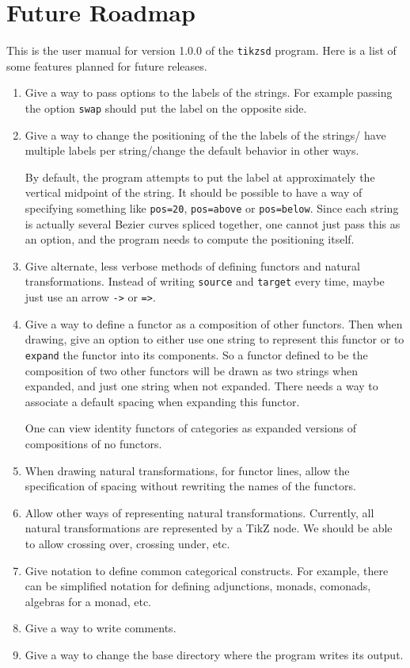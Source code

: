 \documentclass{amsart}
\begin{document}
\section{Future Roadmap}
This is the user manual for version 1.0.0 of the \texttt{tikzsd} program.
Here is a list of some features planned for future releases.
\begin{enumerate}
\item Give a way to pass options to the labels of the strings.
    For example passing the option \texttt{swap} should put the label on the opposite side.
\item Give a way to change the positioning of the  the labels of the strings/
        have multiple labels per string/change the default behavior in other ways.

    By default, the program attempts to put the label at approximately the vertical midpoint
        of the string.
    It should be possible to have a way of specifying something like \texttt{pos=20},
        \texttt{pos=above} or \texttt{pos=below}.
    Since each string is actually several Bezier curves spliced together,
        one cannot just pass this as an option, and the program needs to compute the positioning
        itself.
\item Give alternate, less verbose methods of defining functors and natural transformations.
    Instead of writing \texttt{source} and \texttt{target} every time, maybe just 
        use an arrow \texttt{->} or \texttt{=>}.
\item Give a way to define a functor as a composition of other functors.
    Then when drawing, give an option to either use one string to represent this functor
        or to \texttt{expand} the functor into its components.
    So a functor defined to be the composition of two other functors will be drawn
        as two strings when expanded, and just one string when not expanded.
    There needs a way to associate a default spacing when expanding this functor.

    One can view identity functors of categories as expanded versions of compositions
        of no functors.
\item When drawing natural transformations, for functor lines, allow the specification
        of spacing without rewriting the names of the functors.
\item Allow other ways of representing natural transformations.
    Currently, all natural transformations are represented by a TikZ node.
    We should be able to allow crossing over, crossing under, etc.
\item Give notation to define common categorical constructs.
    For example, there can be simplified notation for defining adjunctions,
        monads, comonads, algebras for a monad, etc.
\item Give a way to write comments.
\item Give a way to change the base directory where the program writes its output.
\end{enumerate}
\end{document}
